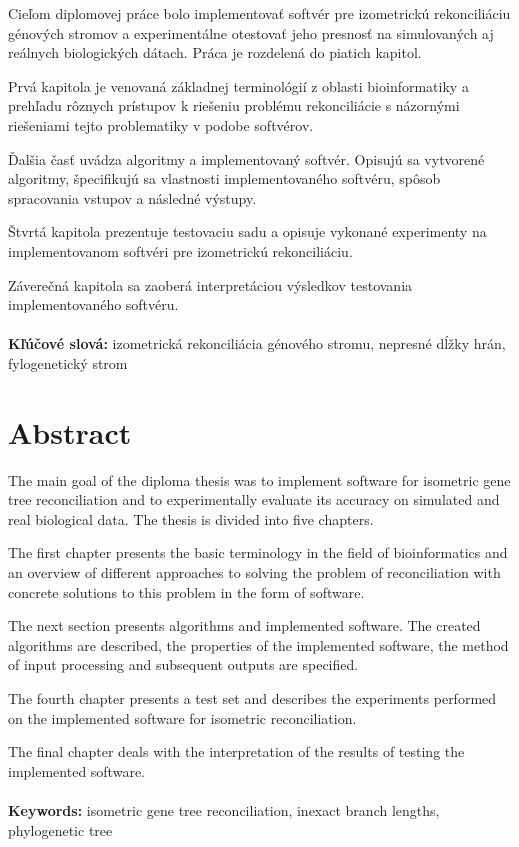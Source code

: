 \documentclass[12pt,a4paper,oneside]{book}
\begin{document}
Cieľom diplomovej práce bolo implementovať softvér pre izometrickú rekonciliáciu génových stromov a experimentálne otestovať jeho presnosť na simulovaných aj reálnych biologických dátach. Práca je rozdelená do piatich kapitol.

Prvá kapitola je venovaná základnej terminológií z oblasti bioinformatiky a prehľadu rôznych prístupov k riešeniu problému rekonciliácie s názornými riešeniami tejto problematiky v podobe softvérov.

Ďalšia časť uvádza algoritmy a implementovaný softvér. Opisujú sa vytvorené algoritmy, špecifikujú sa vlastnosti implementovaného softvéru, spôsob spracovania vstupov a následné výstupy.

Štvrtá kapitola prezentuje testovaciu sadu a opisuje vykonané experimenty na implementovanom softvéri pre izometrickú rekonciliáciu.

Záverečná kapitola sa zaoberá interpretáciou výsledkov testovania implementovaného softvéru. 
\\\\
\textbf{Kľúčové slová:} izometrická rekonciliácia génového stromu, nepresné dĺžky hrán, fylogenetický strom
\vfill\eject 

\chapter*{Abstract}

The main goal of the diploma thesis was to implement software for isometric gene tree reconciliation and to experimentally evaluate its accuracy on simulated and real biological data. The thesis is divided into five chapters.

The first chapter presents the basic terminology in the field of bioinformatics and an overview of different approaches to solving the problem of reconciliation with concrete solutions to this problem in the form of software.

The next section presents algorithms and implemented software. The created algorithms are described, the properties of the implemented software, the method of input processing and subsequent outputs are specified.

The fourth chapter presents a test set and describes the experiments performed on the implemented software for isometric reconciliation.

The final chapter deals with the interpretation of the results of testing the implemented software.
\\\\
\textbf{Keywords:} isometric gene tree  reconciliation, inexact branch lengths, phylogenetic tree
\vfill\eject  
\end{document}
